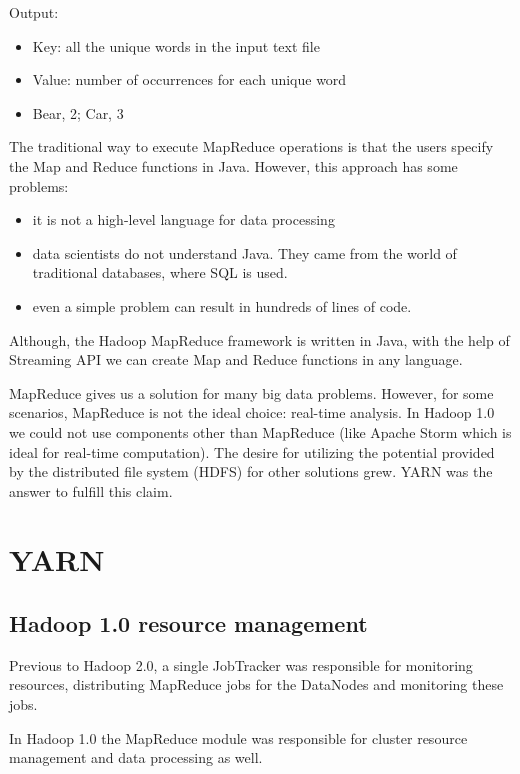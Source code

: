 \noindent Output:
\begin{itemize}
	\item Key: all the unique words in the input text file
	\item Value: number of occurrences for each unique word
	\item \eg  Bear, 2; Car, 3
\end{itemize}

The traditional way to execute MapReduce operations is that the users specify the Map and Reduce functions in Java. However, this approach has some problems:
\begin{itemize}
	\item it is not a high-level language for data processing
	\item data scientists do not understand Java. They came from the world of traditional databases, where SQL is used.
	\item even a simple problem can result in hundreds of lines of code.
\end{itemize}

Although, the Hadoop MapReduce framework is written in Java, with the help of Streaming API we can create Map and Reduce functions in any language.

MapReduce gives us a solution for many big data problems. However, for some scenarios, MapReduce is not the ideal choice: \eg real-time analysis. In Hadoop 1.0 we could not use components other than MapReduce (like Apache Storm which is ideal for real-time computation). The desire for utilizing the potential provided by the distributed file system (HDFS) for other solutions grew. YARN was the answer to fulfill this claim.

\section{YARN  \cite{Hadoop-current}}
\subsection{Hadoop 1.0 resource management}
Previous to Hadoop 2.0, a single JobTracker was responsible for monitoring resources, distributing MapReduce jobs for the DataNodes and monitoring these jobs. 

In Hadoop 1.0 the MapReduce module was responsible for cluster resource management and data processing as well.

